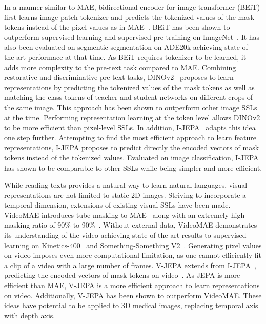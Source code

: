 \documentclass[a4paper,11pt,oneside]{report}
\begin{document}
In a manner similar to MAE, bidirectional encoder for image transformer (BEiT) first learns image patch tokenizer and predicts the tokenized values of the mask tokens instead of the pixel values as in MAE~\cite{Bao2022beit}. BEiT has been shown to outperform supervised learning and supervised pre-training on ImageNet~\cite{Russakovsky2015}. It has also been evaluated on segmentic segmentation on ADE20k achieving state-of-the-art performace at that time. As BEiT requires tokenizer to be learned, it adds more complexity to the pre-text task compared to MAE. Combining restorative and discriminative pre-text tasks, DINOv2~\cite{Oquab2024dinov} proposes to learn representations by predicting the tokenized values of the mask tokens as well as matching the class tokens of teacher and student networks on different crops of the same image. This approach has been shown to outperform other image SSLs at the time. Performing representation learning at the token level allows DINOv2 to be more efficient than pixel-level SSLs. In addition, I-JEPA~\cite{Assran2023} adapts this idea one step further. Attempting to find the most efficient approach to learn feature representations, I-JEPA proposes to predict directly the encoded vectors of mask tokens instead of the tokenized values. Evaluated on image classification, I-JEPA has shown to be comparable to other SSLs while being simpler and more efficient. 

While reading texts provides a natural way to learn natural languages, visual representations are not limited to static 2D images. Striving to incorporate a temporal dimension, extensions of existing visual SSLs have been made. VideoMAE introduces tube masking to MAE~\cite{He2022} along with an extremely high masking ratio of 90\% to 90\%~\cite{Tong2022VideoMAE}. Without external data, VideoMAE demonstrates its understanding of the video achieving state-of-the-art results to supervised learning on Kinetics-400~\cite{Kay2017Kinetics} and Something-Something V2~\cite{Goyal2017Something-SomethingV2}. Generating pixel values on video imposes even more computational limitation, as one cannot efficiently fit a clip of a video with a large number of frames. V-JEPA extends from I-JEPA~\cite{Assran2023}, predicting the encoded vectors of mask tokens on video~\cite{Bardes2024Vjepa}. As JEPA is more efficient than MAE, V-JEPA is a more efficient approach to learn representations on video. Additionally, V-JEPA has been shown to outperform VideoMAE. These ideas have potential to be applied to 3D medical images, replacing temporal axis with depth axis.
\end{document}
